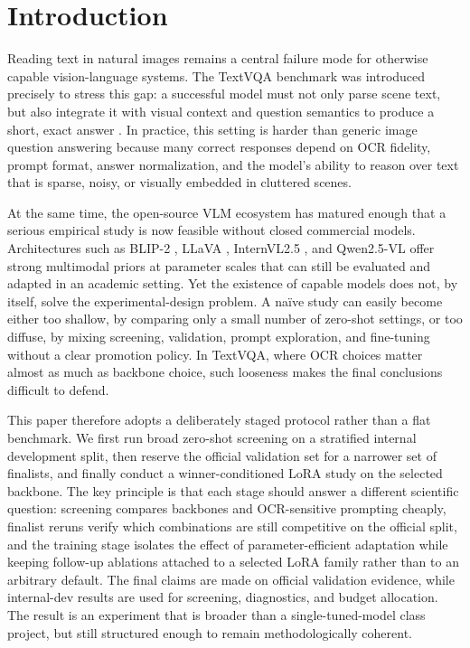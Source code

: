 \section{Introduction}

Reading text in natural images remains a central failure mode for otherwise capable vision-language systems. The TextVQA benchmark was introduced precisely to stress this gap: a successful model must not only parse scene text, but also integrate it with visual context and question semantics to produce a short, exact answer \citep{singh2019textvqa}. In practice, this setting is harder than generic image question answering \citep{antol2015vqa} because many correct responses depend on OCR fidelity, prompt format, answer normalization, and the model's ability to reason over text that is sparse, noisy, or visually embedded in cluttered scenes.

At the same time, the open-source VLM ecosystem has matured enough that a serious empirical study is now feasible without closed commercial models. Architectures such as BLIP-2 \citep{li2023blip2}, LLaVA \citep{liu2023visual}, InternVL2.5 \citep{chen2024internvl25}, and Qwen2.5-VL \citep{qwen2025qwen25vl} offer strong multimodal priors at parameter scales that can still be evaluated and adapted in an academic setting. Yet the existence of capable models does not, by itself, solve the experimental-design problem. A naïve study can easily become either too shallow, by comparing only a small number of zero-shot settings, or too diffuse, by mixing screening, validation, prompt exploration, and fine-tuning without a clear promotion policy. In TextVQA, where OCR choices matter almost as much as backbone choice, such looseness makes the final conclusions difficult to defend.

This paper therefore adopts a deliberately staged protocol rather than a flat benchmark. We first run broad zero-shot screening on a stratified internal development split, then reserve the official validation set for a narrower set of finalists, and finally conduct a winner-conditioned LoRA study on the selected backbone. The key principle is that each stage should answer a different scientific question: screening compares backbones and OCR-sensitive prompting cheaply, finalist reruns verify which combinations are still competitive on the official split, and the training stage isolates the effect of parameter-efficient adaptation while keeping follow-up ablations attached to a selected LoRA family rather than to an arbitrary default. The final claims are made on official validation evidence, while internal-dev results are used for screening, diagnostics, and budget allocation. The result is an experiment that is broader than a single-tuned-model class project, but still structured enough to remain methodologically coherent.

